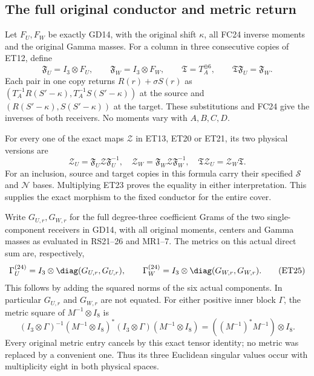 \subsection{The full original conductor and metric return}
Let $F_U,F_W$ be exactly GD14, with the original shift $\kappa$,
all FC24 inverse moments and the original Gamma masses.
For a column in three consecutive copies of ET12, define
\[
 \mathfrak F_U=I_3\otimes F_U,\qquad
 \mathfrak F_W=I_3\otimes F_W,\qquad
 \mathfrak T=T_A^{\oplus6},\qquad
 \mathfrak T\mathfrak F_U=\mathfrak F_W .
 \tag{ET23}
\]
Each pair in one copy returns $R(r)+\sigma S(r)$ as
$(T_A^{-1}R(S'-\kappa),T_A^{-1}S(S'-\kappa))$ at the source
and $(R(S'-\kappa),S(S'-\kappa))$ at the target.
These substitutions and FC24 give the inverses of both receivers.
No moments vary with $A,B,C,D$.

For every one of the exact maps $\mathcal Z$ in ET13, ET20 or ET21,
its two physical versions are
\[
 \mathcal Z_U=\mathfrak F_U\mathcal Z\mathfrak F_U^{-1},\quad
 \mathcal Z_W=\mathfrak F_W\mathcal Z\mathfrak F_W^{-1},\quad
 \mathfrak T\mathcal Z_U=\mathcal Z_W\mathfrak T .
 \tag{ET24}
\]
For an inclusion, source and target copies in this formula carry their
specified $\mathscr S$ and $\mathscr N$ bases. Multiplying ET23 proves
the equality in either interpretation. This supplies the exact
morphism to the fixed conductor for the entire cover.

Write $G_{U,r},G_{W,r}$ for the full degree-three coefficient Grams
of the two single-component receivers in GD14, with all original
moments, centers and Gamma masses as evaluated in RS21--26 and MR1--7.
The metrics on this actual direct sum are, respectively,
\[
 \Gamma_U^{(24)}=I_3\otimes\diag(G_{U,r},G_{U,r}),\qquad
 \Gamma_W^{(24)}=I_3\otimes\diag(G_{W,r},G_{W,r}).
 \tag{ET25}
\]
This follows by adding the squared norms of the six actual components.
In particular $G_{U,r}$ and $G_{W,r}$ are not equated.
For either positive inner block $\Gamma$, the metric square of
$M^{-1}\otimes I_8$ is
\[
 (I_3\otimes\Gamma)^{-1}
 (M^{-1}\otimes I_8)^*(I_3\otimes\Gamma)
 (M^{-1}\otimes I_8)
 =((M^{-1})^*M^{-1})\otimes I_8 .
 \tag{ET26}
\]
Every original metric entry cancels by this exact tensor identity;
no metric was replaced by a convenient one. Thus its three Euclidean
singular values occur with multiplicity eight in both physical spaces.


